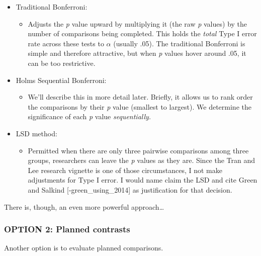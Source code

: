 \documentclass[
  english,
]{book}
\providecommand{\tightlist}{%
  \setlength{\itemsep}{0pt}\setlength{\parskip}{0pt}}
\begin{document}
\begin{itemize}
\tightlist
\item
  Traditional Bonferroni:

  \begin{itemize}
  \tightlist
  \item
    Adjusts the \emph{p} value upward by multiplying it (the raw \emph{p} values) by the number of comparisons being completed. This holds the \emph{total} Type I error rate across these tests to \(\alpha\) (usually .05). The traditional Bonferroni is simple and therefore attractive, but when \emph{p} values hover around .05, it can be too restrictive.
  \end{itemize}
\item
  Holms Sequential Bonferroni:

  \begin{itemize}
  \tightlist
  \item
    We'll describe this in more detail later. Briefly, it allows us to rank order the comparisons by their \emph{p} value (smallest to largest). We determine the significance of each \emph{p} value \emph{sequentially.}\\
  \end{itemize}
\item
  LSD method:

  \begin{itemize}
  \tightlist
  \item
    Permitted when there are only three pairwise comparisons among three groups, researchers can leave the \emph{p} values as they are. Since the Tran and Lee \citeyearpar{tran_you_2014} research vignette is one of those circumstances, I not make adjustments for Type I error. I would name claim the LSD and cite Green and Salkind {[}-green\_using\_2014{]} as justification for that decision.
  \end{itemize}
\end{itemize}

There is, though, an even more powerful approach\ldots{}

\hypertarget{option-2-planned-contrasts}{%
\subsubsection{OPTION 2: Planned contrasts}\label{option-2-planned-contrasts}}

Another option is to evaluate planned comparisons.
\end{document}
